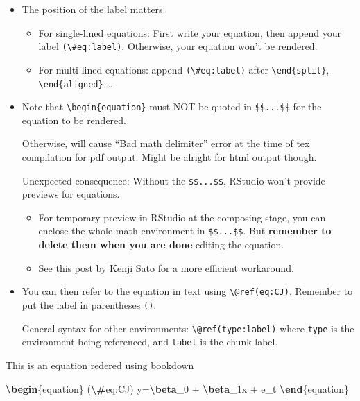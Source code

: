 \documentclass[
]{book}
\newenvironment{Shaded}{\begin{snugshade}}{\end{snugshade}}
\newcommand{\ExtensionTok}[1]{#1}
\newcommand{\KeywordTok}[1]{\textcolor[rgb]{0.13,0.29,0.53}{\textbf{#1}}}
\newcommand{\NormalTok}[1]{#1}
\newcommand{\SpecialCharTok}[1]{\textcolor[rgb]{0.81,0.36,0.00}{\textbf{#1}}}
\newcommand{\SpecialStringTok}[1]{\textcolor[rgb]{0.31,0.60,0.02}{#1}}
\providecommand{\tightlist}{%
  \setlength{\itemsep}{0pt}\setlength{\parskip}{0pt}}
\theoremstyle{definition}
\theoremstyle{definition}
\theoremstyle{definition}
\theoremstyle{definition}
\theoremstyle{remark}
\begin{document}
\begin{itemize}
\item
  {The position of the label matters}.

  \begin{itemize}
  \tightlist
  \item
    For single-lined equations: First write your equation, then append your label \texttt{(\textbackslash{}\#eq:label)}. Otherwise, your equation won't be rendered.
  \item
    For multi-lined equations: append \texttt{(\textbackslash{}\#eq:label)} after \texttt{\textbackslash{}end\{split\}}, \texttt{\textbackslash{}end\{aligned\}} \ldots{}
  \end{itemize}
\item
  Note that \texttt{\textbackslash{}begin\{equation\}} must {NOT be quoted in \texttt{\$\$...\$\$}} for the equation to be rendered.

  Otherwise, will cause ``Bad math delimiter'' error at the time of tex compilation for pdf output. Might be alright for html output though.

  Unexpected consequence: Without the \texttt{\$\$...\$\$}, RStudio won't provide previews for equations.

  \begin{itemize}
  \tightlist
  \item
    For temporary preview in RStudio at the composing stage, you can enclose the whole math environment in \texttt{\$\$...\$\$}. But \textbf{remember to delete them when you are done} editing the equation.
  \item
    See \href{https://www.kenjisato.jp/en/post/2017/02/cross-referenceable-equation-with-preview-in-rmarkdown/}{this post by Kenji Sato} for a more efficient workaround.
  \end{itemize}
\item
  You can then refer to the equation in text using \texttt{\textbackslash{}@ref(eq:CJ)}. Remember to put the label in parentheses \texttt{()}.

  General syntax for other environments: \texttt{\textbackslash{}@ref(type:label)} where \texttt{type} is the environment being referenced, and \texttt{label} is the chunk label.
\end{itemize}

\begin{Shaded}
\begin{Highlighting}[]
\NormalTok{This is an equation redered using bookdown}

\KeywordTok{\textbackslash{}begin}\NormalTok{\{}\ExtensionTok{equation}\NormalTok{\}}\SpecialStringTok{ (}\SpecialCharTok{\textbackslash{}\#}\SpecialStringTok{eq:CJ)}
\SpecialStringTok{y=}\SpecialCharTok{\textbackslash{}beta}\SpecialStringTok{\_0 + }\SpecialCharTok{\textbackslash{}beta}\SpecialStringTok{\_1x + e\_t}
\KeywordTok{\textbackslash{}end}\NormalTok{\{}\ExtensionTok{equation}\NormalTok{\}}
\end{Highlighting}
\end{Shaded}
\end{document}
